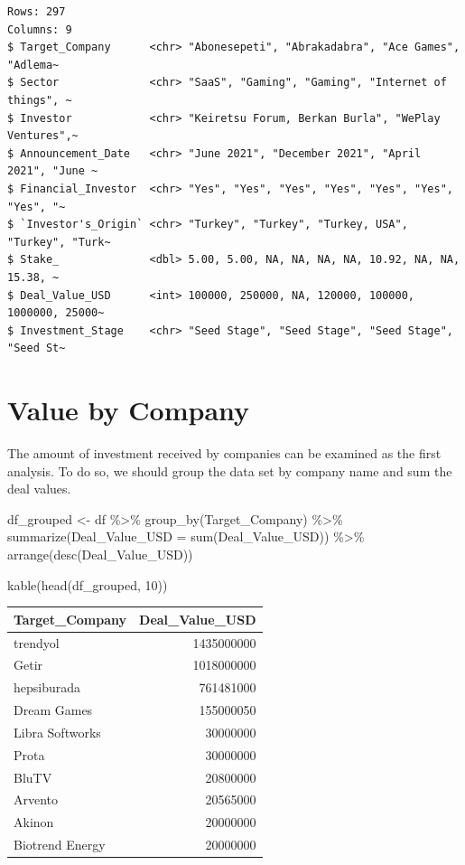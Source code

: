 \documentclass[
  letterpaper,
  DIV=11,
  numbers=noendperiod]{scrreprt}
\newenvironment{Shaded}{\begin{snugshade}}{\end{snugshade}}
\newcommand{\AttributeTok}[1]{\textcolor[rgb]{0.40,0.45,0.13}{#1}}
\newcommand{\DecValTok}[1]{\textcolor[rgb]{0.68,0.00,0.00}{#1}}
\newcommand{\FunctionTok}[1]{\textcolor[rgb]{0.28,0.35,0.67}{#1}}
\newcommand{\NormalTok}[1]{\textcolor[rgb]{0.00,0.23,0.31}{#1}}
\newcommand{\OtherTok}[1]{\textcolor[rgb]{0.00,0.23,0.31}{#1}}
\newcommand{\SpecialCharTok}[1]{\textcolor[rgb]{0.37,0.37,0.37}{#1}}
\begin{document}
\begin{verbatim}
Rows: 297
Columns: 9
$ Target_Company      <chr> "Abonesepeti", "Abrakadabra", "Ace Games", "Adlema~
$ Sector              <chr> "SaaS", "Gaming", "Gaming", "Internet of things", ~
$ Investor            <chr> "Keiretsu Forum, Berkan Burla", "WePlay Ventures",~
$ Announcement_Date   <chr> "June 2021", "December 2021", "April 2021", "June ~
$ Financial_Investor  <chr> "Yes", "Yes", "Yes", "Yes", "Yes", "Yes", "Yes", "~
$ `Investor's_Origin` <chr> "Turkey", "Turkey", "Turkey, USA", "Turkey", "Turk~
$ Stake_              <dbl> 5.00, 5.00, NA, NA, NA, NA, 10.92, NA, NA, 15.38, ~
$ Deal_Value_USD      <int> 100000, 250000, NA, 120000, 100000, 1000000, 25000~
$ Investment_Stage    <chr> "Seed Stage", "Seed Stage", "Seed Stage", "Seed St~
\end{verbatim}

\hypertarget{value-by-company}{%
\section{Value by Company}\label{value-by-company}}

The amount of investment received by companies can be examined as the
first analysis. To do so, we should group the data set by company name
and sum the deal values.

\begin{Shaded}
\begin{Highlighting}[]
\NormalTok{df\_grouped }\OtherTok{\textless{}{-}}\NormalTok{ df }\SpecialCharTok{\%\textgreater{}\%}
  \FunctionTok{group\_by}\NormalTok{(Target\_Company) }\SpecialCharTok{\%\textgreater{}\%}
  \FunctionTok{summarize}\NormalTok{(}\AttributeTok{Deal\_Value\_USD =} \FunctionTok{sum}\NormalTok{(Deal\_Value\_USD)) }\SpecialCharTok{\%\textgreater{}\%}
  \FunctionTok{arrange}\NormalTok{(}\FunctionTok{desc}\NormalTok{(Deal\_Value\_USD))}

\FunctionTok{kable}\NormalTok{(}\FunctionTok{head}\NormalTok{(df\_grouped, }\DecValTok{10}\NormalTok{))}
\end{Highlighting}
\end{Shaded}

\begin{longtable}[]{@{}lr@{}}
\toprule()
Target\_Company & Deal\_Value\_USD \\
\midrule()
\endhead
trendyol & 1435000000 \\
Getir & 1018000000 \\
hepsiburada & 761481000 \\
Dream Games & 155000050 \\
Libra Softworks & 30000000 \\
Prota & 30000000 \\
BluTV & 20800000 \\
Arvento & 20565000 \\
Akinon & 20000000 \\
Biotrend Energy & 20000000 \\
\bottomrule()
\end{longtable}
\end{document}

